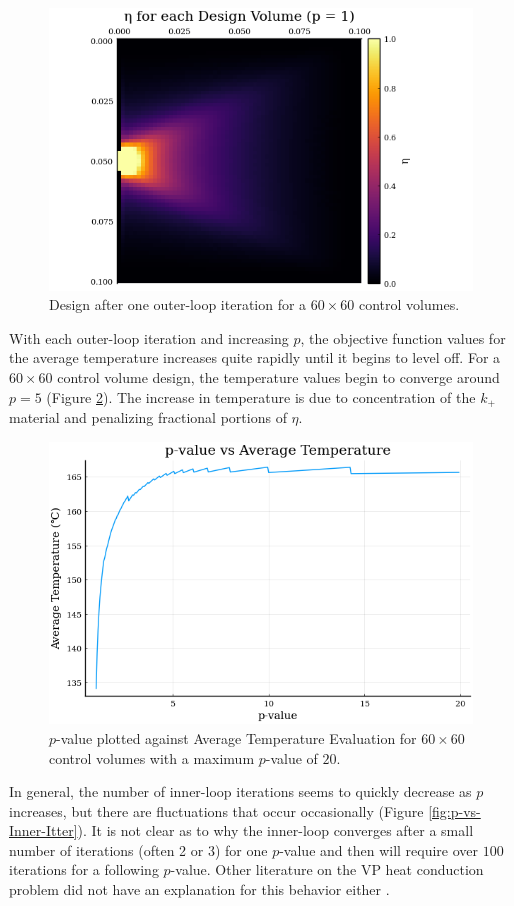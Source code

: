 \begin{figure}
	\centering
	\includegraphics[width=0.75\linewidth]{Chapter_III_Implementation_and_Results/Images/60x60_1p.png}
	\caption[One Outer-Loop Iteration]{Design after one outer-loop iteration for a $60\times 60$ control volumes.}
	\label{fig:60x60-p=1}
\end{figure}

With each outer-loop iteration and increasing $p$, the objective function values for the average temperature increases quite rapidly until it begins to level off. For a $60\times 60$ control volume design, the temperature values begin to converge around $p=5$ (Figure \ref{fig:p-vs-T}). The increase in temperature is due to concentration of the $k_+$ material and penalizing fractional portions of $\eta$.

\begin{figure}
	\centering
	\includegraphics[width=0.75\linewidth]{Chapter_III_Implementation_and_Results/Images/60x60-p_vs_T.png}
	\caption[$p$-value vs. $T_{av}$]{$p$-value plotted against Average Temperature Evaluation for $60\times 60$ control volumes with a maximum $p$-value of $20$.}
	\label{fig:p-vs-T}
\end{figure}

In general, the number of inner-loop iterations seems to quickly decrease as $p$ increases, but there are fluctuations that occur occasionally (Figure \ref{fig:p-vs-Inner-Itter}). It is not clear as to why the inner-loop converges after a small number of iterations (often 2 or 3) for one $p$-value and then will require over $100$ iterations for a following $p$-value. Other literature on the VP heat conduction problem did not have an explanation for this behavior either \cite{Marck2012}.

